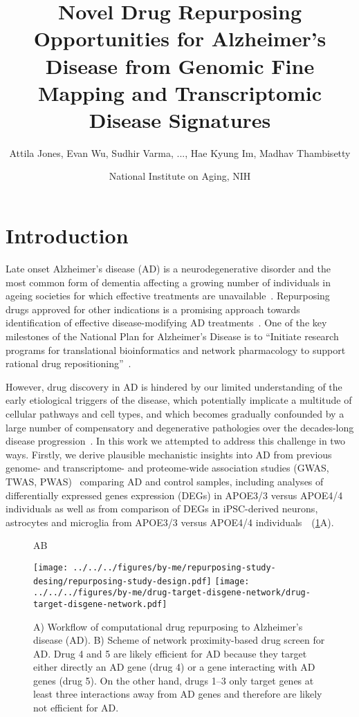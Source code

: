 \documentclass[letterpaper]{article}
\title{Novel Drug Repurposing Opportunities for Alzheimer's Disease from
  Genomic Fine Mapping and Transcriptomic Disease Signatures}
\author{Attila Jones, Evan Wu, Sudhir Varma, ..., Hae Kyung Im, Madhav Thambisetty}
\date{National Institute on Aging, NIH}
\begin{document}
\maketitle

\section{Introduction}

Late onset Alzheimer's disease (AD) is a neurodegenerative disorder and the most
common form of dementia affecting a growing number of individuals in ageing
societies for which effective treatments are
unavailable~\citep{Bondi2017,Masters2015}.  Repurposing drugs approved for other indications is
a promising approach  towards identification of effective disease-modifying AD
treatments~\citep{Pushpakom2019,Fang2021,Taubes2021}.  One of the key
milestones of the National Plan for Alzheimer’s Disease is to ``Initiate
research programs for translational bioinformatics and network pharmacology to
support rational drug repositioning''~\citep{Aging}.

However, drug discovery in AD is hindered by our limited understanding of the
early etiological triggers of the disease, which potentially implicate a
multitude of cellular pathways and cell types, and which becomes gradually
confounded by a large number of compensatory and degenerative pathologies over
the decades-long disease progression~\citep{DeStrooper2016}.  In this work we
attempted to address this challenge in two ways.  Firstly, we derive plausible
mechanistic insights into AD from previous genome- and transcriptome- and
proteome-wide association studies (GWAS, TWAS,
PWAS)~\citep{Jansen2019,Kunkle2019,Gerring2020,Baird2021,Schwartzentruber2021,Wightman2021,Wingo2021}
comparing AD and control samples, including analyses of differentially
expressed genes expression (DEGs) in APOE3/3 versus APOE4/4 individuals as
well as from comparison of DEGs in iPSC-derived neurons, astrocytes and
microglia from APOE3/3 versus APOE4/4
individuals~\citep{Taubes2021,Lin2018}~(\ref{fig:workflow}A).

\begin{figure}
\hspace{0.05\textwidth}A\hspace{0.7\textwidth}B

\texttt{[image: ../../../figures/by-me/repurposing-study-desing/repurposing-study-design.pdf]}
\texttt{[image: ../../../figures/by-me/drug-target-disgene-network/drug-target-disgene-network.pdf]}
\caption{
  A) Workflow of computational drug repurposing to Alzheimer's disease (AD).
  B) Scheme of network proximity-based drug screen for AD.  Drug 4 and 5 are
  likely efficient for AD because they target either directly an AD gene (drug
  4) or a gene interacting with AD genes (drug 5).  On the other hand, drugs
  1--3 only target genes at least three interactions away from AD genes and
  therefore are likely not efficient for AD.
}
\label{fig:workflow}
\end{figure}
\end{document}
